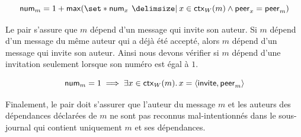 \begin{equation}\label{eq:linear-verif}
    \trm{num}_m = 1 + \trm{max}(\set*{\trm{num}_x \given x \in \trm{ctx}_W(m) \land \trm{peer}_x = \trm{peer}_m})
\end{equation}

Le pair s'assure que $m$ dépend d'un message qui invite son auteur.
Si $m$ dépend d'un message du même auteur qui a déjà été accepté, alors $m$ dépend d'un message qui invite son auteur.
Ainsi nous devons vérifier si $m$ dépend d'une invitation seulement lorsque son numéro est égal à $1$.

\begin{equation}\label{eq:invit-verif}
    \operatorname{\mathsf{num}}_m = 1 \implies \exists x \in \operatorname{\mathsf{ctx}}_W(m) \ldotp x = \langle\operatorname{\mathsf{invite}}, \operatorname{\mathsf{peer}}_m\rangle
\end{equation}

%

Finalement, le pair doit s'assurer que l'auteur du message $m$ et les auteurs des dépendances déclarées de $m$ ne sont pas reconnus mal-intentionnés dans le sous-journal qui contient uniquement $m$ et ses dépendances.


